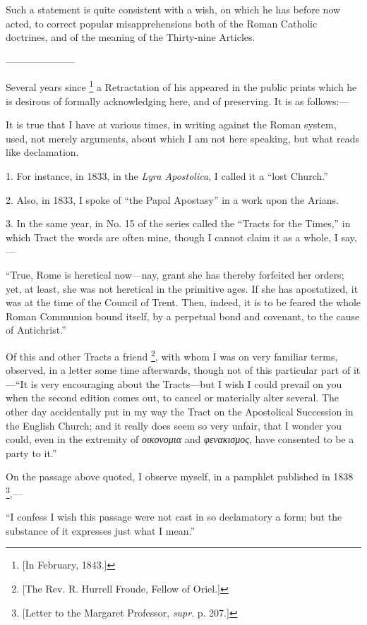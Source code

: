 Such a statement is quite consistent with a wish, on which he has
before now acted, to correct popular misapprehensions both of the
Roman Catholic doctrines, and of the meaning of the Thirty-nine
Articles.

———————

Several years since \footnote{[In February, 1843.]} a
Retractation of his appeared in the public prints which he is desirous
of formally acknowledging here, and of preserving. It is as follows:—

It is true that I have at various times, in writing
against the Roman system, used, not merely arguments, about which I am
not here speaking, but what reads like declamation.

1. For instance, in 1833, in the \emph{Lyra Apostolica},
I called it a ``lost Church.''

2. Also, in 1833, I spoke of ``the Papal
Apostasy'' in a work upon the Arians.

3. In the same year, in No. 15 of the series called
the ``Tracts for the Times,'' in which Tract the words are
often mine, though I cannot claim it as a whole, I say,—

``True, Rome is heretical now—nay, grant she
has thereby forfeited her orders; yet, at least, she was not heretical
in the primitive ages. If she has apostatized, it was at the time of
the Council of Trent. Then, indeed, it is to be feared the whole Roman
Communion bound itself, by a perpetual bond and covenant, to the cause
of Antichrist.''

Of this and other Tracts a friend \footnote{[The Rev. R. Hurrell Froude, Fellow of
Oriel.]}, with whom I was on very familiar terms, observed, in a letter
some time afterwards, though not of this particular part of it—``It
is very encouraging about the Tracts—but I wish I could prevail on
you when the second edition comes out, to cancel or materially alter
several. The other day accidentally put in my way the Tract on the
Apostolical Succession in the English Church; and it really does seem
so very unfair, that I wonder you could, even in the extremity of \emph{οικονομια}
and \emph{φενακισμος},
have consented to be a party to it.''

On the passage above quoted, I observe myself, in a
pamphlet published in 1838 \footnote{[Letter to the Margaret
Professor, \emph{supr}.
p. 207.]},—

``I confess I wish this passage were not cast in
so declamatory a form; but the substance of it expresses just what I
mean.''

